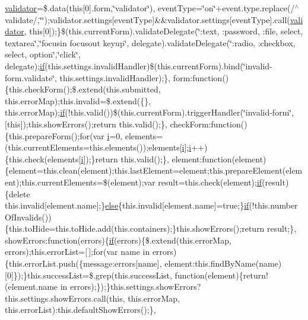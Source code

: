 \begin{DoxyCompactItemize}
\hyperlink{_scripts_2jquery_8validate_8js_a2dc8272bb221cdffcccbd20db038f172}{validator}=\$.data(this\mbox{[}0\mbox{]}.form,\char`\"{}validator\char`\"{}), event\+Type=\char`\"{}on\char`\"{}+event.\+type.\+replace(/$^\wedge$validate/,\char`\"{}\char`\"{});validator.\+settings\mbox{[}event\+Type\mbox{]}\&\&validator.\+settings\mbox{[}event\+Type\mbox{]}.call(\hyperlink{_scripts_2jquery_8validate_8js_a2dc8272bb221cdffcccbd20db038f172}{validator}, this\mbox{[}0\mbox{]});\}\$(this.\+current\+Form).validate\+Delegate(\char`\"{}\+:text, \+:password, \+:file, select, textarea\char`\"{},\char`\"{}focusin focusout keyup\char`\"{}, delegate).validate\+Delegate(\char`\"{}\+:radio, \+:checkbox, select, option\char`\"{},\char`\"{}click\char`\"{}, delegate);\hyperlink{_scripts_2respond_8min_8js_a93851d60dd037a83509a1757b9ee7b66}{if}(this.\+settings.\+invalid\+Handler)\$(this.\+current\+Form).bind(\char`\"{}invalid-\/form.\+validate\char`\"{}, this.\+settings.\+invalid\+Handler);\}, form\+:function()\{this.\+check\+Form();\$.extend(this.\+submitted, this.\+error\+Map);this.\+invalid=\$.extend(\{\}, this.\+error\+Map);\hyperlink{_scripts_2respond_8min_8js_a93851d60dd037a83509a1757b9ee7b66}{if}(!this.\+valid())\$(this.\+current\+Form).trigger\+Handler(\char`\"{}invalid-\/form\char`\"{}, \mbox{[}this\mbox{]});this.\+show\+Errors();return this.\+valid();\}, check\+Form\+:function()\{this.\+prepare\+Form();for(var \hyperlink{_scripts_2respond_8min_8js_a5e25b1d1bed9ab5f3174b76d6a722180}{i}=0, elements=(this.\+current\+Elements=this.\+elements());elements\mbox{[}\hyperlink{_scripts_2respond_8min_8js_a5e25b1d1bed9ab5f3174b76d6a722180}{i}\mbox{]};\hyperlink{_scripts_2respond_8min_8js_a5e25b1d1bed9ab5f3174b76d6a722180}{i}++)\{this.\+check(elements\mbox{[}\hyperlink{_scripts_2respond_8min_8js_a5e25b1d1bed9ab5f3174b76d6a722180}{i}\mbox{]});\}return this.\+valid();\}, element\+:function(element)\{element=this.\+clean(element);this.\+last\+Element=element;this.\+prepare\+Element(element);this.\+current\+Elements=\$(element);var result=this.\+check(element);\hyperlink{_scripts_2respond_8min_8js_a93851d60dd037a83509a1757b9ee7b66}{if}(result)\{delete this.\+invalid\mbox{[}element.\+name\mbox{]};\}\hyperlink{_scripts_2jquery_8validate_8js_a0544c3fe466e421738dae463968b70ba}{else}\{this.\+invalid\mbox{[}element.\+name\mbox{]}=true;\}\hyperlink{_scripts_2respond_8min_8js_a93851d60dd037a83509a1757b9ee7b66}{if}(!this.\+number\+Of\+Invalids())\{this.\+to\+Hide=this.\+to\+Hide.\+add(this.\+containers);\}this.\+show\+Errors();return result;\}, show\+Errors\+:function(errors)\{\hyperlink{_scripts_2respond_8min_8js_a93851d60dd037a83509a1757b9ee7b66}{if}(errors)\{\$.extend(this.\+error\+Map, errors);this.\+error\+List=\mbox{[}$\,$\mbox{]};for(var name in errors)\{this.\+error\+List.\+push(\{message\+:errors\mbox{[}name\mbox{]}, element\+:this.\+find\+By\+Name(name)\mbox{[}0\mbox{]}\});\}this.\+success\+List=\$.grep(this.\+success\+List, function(element)\{return!(element.\+name in errors);\});\}this.\+settings.\+show\+Errors?this.\+settings.\+show\+Errors.\+call(this, this.\+error\+Map, this.\+error\+List)\+:this.\+default\+Show\+Errors();\}, 
\end{DoxyCompactItemize}
